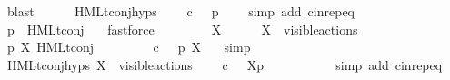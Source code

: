 \begin{isabellebody}
\ blast\isanewline
\ \ \ \ \isamarkupfalse%
\ HMLt{\isacharunderscore}{\kern0pt}conj{\isachardot}{\kern0pt}hyps\ \isamarkupfalse%
\ {\isacartoucheopen}{\isasymforall}{\isasymphi}{\isachardot}{\kern0pt}\ {\isasymphi}\ {\isasymin}\isactrlsub c\ {\isasymPhi}\ {\isasymlongrightarrow}\ p\ {\isasymTTurnstile}\ {\isasymphi}{\isacartoucheclose}\ \isamarkupfalse%
\ {\isacharparenleft}{\kern0pt}simp\ add{\isacharcolon}{\kern0pt}\ cin{\isachardot}{\kern0pt}rep{\isacharunderscore}{\kern0pt}eq{\isacharparenright}{\kern0pt}\isanewline
\ \ \ \ \isamarkupfalse%
\ {\isacartoucheopen}p\ {\isasymTTurnstile}\ HMLt{\isacharunderscore}{\kern0pt}conj\ {\isasymPhi}{\isacartoucheclose}\ \isamarkupfalse%
\ fastforce\isanewline
\ \ \isamarkupfalse%
\isanewline
\ \ \ \ \isamarkupfalse%
\ X\isanewline
\ \ \ \ \isamarkupfalse%
\ {\isacartoucheopen}X\ {\isasymsubseteq}\ visible{\isacharunderscore}{\kern0pt}actions{\isacartoucheclose}\isanewline
\ \ \ \ \isamarkupfalse%
\ {\isacartoucheopen}p\ {\isasymTTurnstile}{\isacharbrackleft}{\kern0pt}X{\isacharbrackright}{\kern0pt}\ HMLt{\isacharunderscore}{\kern0pt}conj\ {\isasymPhi}{\isacartoucheclose}\isanewline
\ \ \ \ \isamarkupfalse%
\ {\isacartoucheopen}{\isacharparenleft}{\kern0pt}{\isasymforall}{\isasymphi}{\isachardot}{\kern0pt}\ {\isasymphi}\ {\isasymin}\isactrlsub c\ {\isasymPhi}\ {\isasymlongrightarrow}\ p\ {\isasymTTurnstile}{\isacharbrackleft}{\kern0pt}X{\isacharbrackright}{\kern0pt}\ {\isasymphi}{\isacharparenright}{\kern0pt}{\isacartoucheclose}\ \isamarkupfalse%
\ simp\isanewline
\ \ \ \ \isamarkupfalse%
\ HMLt{\isacharunderscore}{\kern0pt}conj{\isachardot}{\kern0pt}hyps\ {\isacartoucheopen}X\ {\isasymsubseteq}\ visible{\isacharunderscore}{\kern0pt}actions{\isacartoucheclose}\ \isamarkupfalse%
\ {\isacartoucheopen}{\isasymforall}{\isasymphi}{\isachardot}{\kern0pt}\ {\isasymphi}\ {\isasymin}\isactrlsub c\ {\isasymPhi}\ {\isasymlongrightarrow}\ {\isasymtheta}{\isacharbrackleft}{\kern0pt}X{\isacharbrackright}{\kern0pt}{\isacharparenleft}{\kern0pt}p{\isacharparenright}{\kern0pt}\ {\isasymTurnstile}\ {\isasymsigma}{\isacharparenleft}{\kern0pt}{\isasymphi}{\isacharparenright}{\kern0pt}{\isacartoucheclose}\ \isanewline
\ \ \ \ \ \ \isamarkupfalse%
\ {\isacharparenleft}{\kern0pt}simp\ add{\isacharcolon}{\kern0pt}\ cin{\isachardot}{\kern0pt}rep{\isacharunderscore}{\kern0pt}eq{\isacharparenright}{\kern0pt}\isanewline

\end{isabellebody}

